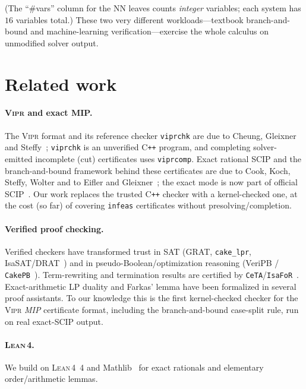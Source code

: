\documentclass[runningheads]{llncs}
\newcommand{\code}[1]{\texttt{#1}}
\newcommand{\scip}{\textsc{SCIP}}
\newcommand{\vipr}{\textsc{Vipr}}
\newcommand{\lean}{\textsc{Lean\,4}}
\begin{document}
\noindent(The ``\#vars'' column for the NN leaves counts \emph{integer} variables; each
system has $16$ variables total.) These two very different workloads---textbook
branch-and-bound and machine-learning verification---exercise the whole calculus on
unmodified solver output.

\section{Related work}\label{sec:related}

\paragraph{\vipr{} and exact MIP.} The \vipr{} format and its reference checker
\code{viprchk} are due to Cheung, Gleixner and Steffy~\cite{vipr}; \code{viprchk} is an
unverified C\texttt{++} program, and completing solver-emitted incomplete (cut)
certificates uses \code{viprcomp}. Exact rational \scip{} and the branch-and-bound
framework behind these certificates are due to Cook, Koch, Steffy, Wolter and to Eifler
and Gleixner~\cite{eifler}; the exact mode is now part of official
\scip~\cite{scip}. Our work replaces the trusted C\texttt{++} checker with a
kernel-checked one, at the cost (so far) of covering \code{infeas} certificates without
presolving/completion.

\paragraph{Verified proof checking.} Verified checkers have transformed trust in SAT
(GRAT, \code{cake\_lpr}, IsaSAT/DRAT~\cite{grat,cakelpr}) and in pseudo-Boolean/optimization
reasoning (VeriPB / \code{CakePB}~\cite{veripb}). Term-rewriting and termination results
are certified by \code{CeTA}/\code{IsaFoR}~\cite{ceta}. Exact-arithmetic LP duality and
Farkas' lemma have been formalized in several proof assistants. To our knowledge this is
the first kernel-checked checker for the \vipr{} \emph{MIP} certificate format, including
the branch-and-bound case-split rule, run on real exact-\scip{} output.

\paragraph{\lean{}.} We build on \lean~4 and Mathlib~\cite{mathlib} for exact rationals
and elementary order/arithmetic lemmas.
\end{document}
